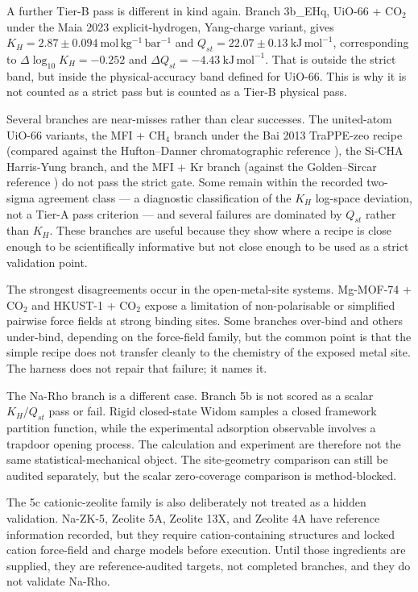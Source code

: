 A further Tier-B pass is different in kind again. Branch 3b\_EHq, UiO-66 + CO\(_2\) under the Maia 2023 explicit-hydrogen, Yang-charge variant, gives \(K_H = 2.87 \pm 0.094\ \mathrm{mol\,kg^{-1}\,bar^{-1}}\) and \(Q_{st} = 22.07 \pm 0.13\ \mathrm{kJ\,mol^{-1}}\), corresponding to \(\Delta \log_{10}K_H = -0.252\) and \(\Delta Q_{st} = -4.43\ \mathrm{kJ\,mol^{-1}}\). That is outside the strict band, but inside the physical-accuracy band defined for UiO-66. This is why it is not counted as a strict pass but is counted as a Tier-B physical pass.

Several branches are near-misses rather than clear successes. The united-atom UiO-66 variants, the MFI + CH\(_4\) branch under the Bai 2013 TraPPE-zeo recipe \cite{Bai2013JPCC} (compared against the Hufton--Danner chromatographic reference \cite{Hufton1993AIChE}), the Si-CHA Harris-Yung branch, and the MFI + Kr branch (against the Golden--Sircar reference \cite{GoldenSircar1994JCIS}) do not pass the strict gate. Some remain within the recorded two-sigma agreement class --- a diagnostic classification of the \(K_H\) log-space deviation, not a Tier-A pass criterion --- and several failures are dominated by \(Q_{st}\) rather than \(K_H\). These branches are useful because they show where a recipe is close enough to be scientifically informative but not close enough to be used as a strict validation point.

The strongest disagreements occur in the open-metal-site systems. Mg-MOF-74 + CO\(_2\) \cite{Mason2011EES,Britt2009PNAS,Queen2011JPCC,Wu2010JPCL,Simmons2011EES,Queen2014ChemSci} and HKUST-1 + CO\(_2\) \cite{Grajciar2011JPCC} expose a limitation of non-polarisable or simplified pairwise force fields at strong binding sites. Some branches over-bind and others under-bind, depending on the force-field family, but the common point is that the simple recipe does not transfer cleanly to the chemistry of the exposed metal site. The harness does not repair that failure; it names it.

The Na-Rho branch is a different case. Branch 5b is not scored as a scalar \(K_H/Q_{st}\) pass or fail. Rigid closed-state Widom samples a closed framework partition function, while the experimental adsorption observable involves a trapdoor opening process. The calculation and experiment are therefore not the same statistical-mechanical object. The site-geometry comparison can still be audited separately, but the scalar zero-coverage comparison is method-blocked.

The 5c cationic-zeolite family is also deliberately not treated as a hidden validation. Na-ZK-5, Zeolite 5A, Zeolite 13X, and Zeolite 4A have reference information recorded, but they require cation-containing structures and locked cation force-field and charge models before execution. Until those ingredients are supplied, they are reference-audited targets, not completed branches, and they do not validate Na-Rho.


